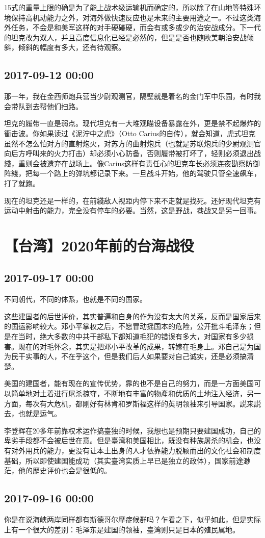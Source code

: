 \documentclass[twocolumn]{ctexart}
\begin{document}
15式的重量上限的确是为了能上战术级运输机而确定的，所以除了在山地等特殊环境保持高机动能力之外，对海外做快速反应也是未来的主要用途之一。不过这类海外任务，不会是和美军这样的对手硬碰硬，而会有或多或少的治安战成分。下一代的坦克改为双人，并且高度信息化已经是必然的，但是是否也随欧美朝治安战倾斜，倾斜的幅度有多大，还有待观察。\subsection*{2017-09-12 00:00}
那一年，我在金西师炮兵营当少尉观测官，隔壁就是着名的金门军中乐园，有时我会带队到去帮他们扫路。

坦克的履带一直是弱点。现代坦克有一大堆观瞄设备暴露在外，更是禁不起爆炸的衝击波。你如果读过《泥泞中之虎》（Otto Carius的自传），就会知道，虎式坦克虽然不怎么怕对方的直射炮火，对苏方的曲射炮兵（也就是苏联炮兵的少尉观测官向后方呼叫来的火力打击）却必须小心防备，否则履带被打坏了，轻则必须退出战綫，重则会被遗弃在战场上。像Carius这样有责任心的坦克车长必须连夜勘察防御阵綫，把每一个路上的弹坑都记录下来。一旦战斗开始，他的驾驶只管全速飙车，打了就跑。

现在的坦克还是一样的，在前綫敌人视距内停下来不走就是找死。还好现代坦克有运动中射击的能力，完全没有停车的必要。当然，这是野战，巷战又是另一回事。\section*{【台湾】2020年前的台海战役}
\subsection*{2017-09-17 00:00}
不同朝代，不同的体系，也就是不同的国家。

这些建国者的后世评价，其实普遍和自身的作为没有太大的关系，反而是国家后来的国运影响较大。邓小平掌权之后，不愿冒动摇国本的危险，公开批斗毛泽东；但是在当时，绝大多数的中共干部私下都知道毛犯的错误有多大，对国家有多少损害。现在的对毛怀念，其实是把邓小平改革的成果，转嫁在毛身上。邓自己是为国为民干实事的人，不在乎这个，但是我们后人如果要对自己诚实，还是必须搞清楚。

美国的建国者，能有现在的宣传优势，靠的也不是自己的努力，而是一方面美国可以简单地对土着进行屠杀掠夺，不断地有丰富的物產和优质的土地注入经济，另一方面，每次有大危机，都刚好有林肯和罗斯福这样的英明领袖来引导国家。説来説去，也就是运气。

李登辉在20多年前靠权术运作搞臺独的时候，我想也是预期只要建国成功，自己的卑劣手段都不会被后世在意。但是臺湾和美国相比，既没有种族屠杀的机会，也没有对外用兵的能力，更没有让本土出身的人才依靠能力脱颖而出的文化社会和制度基础，所以即使建国能成功（其实臺湾实质上早已是独立的政体），国家前途渺茫，他的歷史评价也会是很低的。\subsection*{2017-09-16 00:00}
你是在说海峡两岸同样都有斯德哥尔摩症候群吗？乍看之下，似乎如此，但是实际上有一个很大的差别：毛泽东是建国的领袖，臺湾则只是日本的殖民属地。
\end{document}

